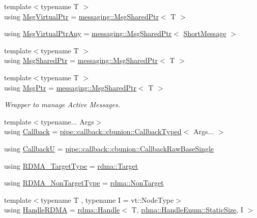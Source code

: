 \begin{DoxyCompactItemize}
\item 
{\footnotesize template$<$typename T $>$ }\\using \hyperlink{namespacevt_a82b5c92ea7ca3ddd2e8a2e27df87fa1a}{Msg\+Virtual\+Ptr} = \hyperlink{structvt_1_1messaging_1_1_msg_shared_ptr}{messaging\+::\+Msg\+Shared\+Ptr}$<$ T $>$
\item 
using \hyperlink{namespacevt_a54674b9f819f4f3a652c6f78d9b62aaf}{Msg\+Virtual\+Ptr\+Any} = \hyperlink{structvt_1_1messaging_1_1_msg_shared_ptr}{messaging\+::\+Msg\+Shared\+Ptr}$<$ \hyperlink{namespacevt_a1125ac1da6c0bbf141e0ea0739d7602d}{Short\+Message} $>$
\item 
{\footnotesize template$<$typename T $>$ }\\using \hyperlink{namespacevt_ab2b3d506ec8e8d1540aede826d84a239}{Msg\+Shared\+Ptr} = \hyperlink{structvt_1_1messaging_1_1_msg_shared_ptr}{messaging\+::\+Msg\+Shared\+Ptr}$<$ T $>$
\item 
{\footnotesize template$<$typename T $>$ }\\using \hyperlink{namespacevt_a9f5ebd62ee9d6dd8829e3e1cc4f858e9}{Msg\+Ptr} = \hyperlink{structvt_1_1messaging_1_1_msg_shared_ptr}{messaging\+::\+Msg\+Shared\+Ptr}$<$ T $>$
\begin{DoxyCompactList}\small\item\em Wrapper to manage Active Messages. \end{DoxyCompactList}\item 
{\footnotesize template$<$typename... Args$>$ }\\using \hyperlink{namespacevt_a57b238783d05de96bc2c4027f7073b7f}{Callback} = \hyperlink{structvt_1_1pipe_1_1callback_1_1cbunion_1_1_callback_typed}{pipe\+::callback\+::cbunion\+::\+Callback\+Typed}$<$ Args... $>$
\item 
using \hyperlink{namespacevt_af79a43a97bc3593fc349f086c874c48e}{CallbackU} = \hyperlink{structvt_1_1pipe_1_1callback_1_1cbunion_1_1_callback_raw_base_single}{pipe\+::callback\+::cbunion\+::\+Callback\+Raw\+Base\+Single}
\item 
using \hyperlink{namespacevt_a9bf03a57102d0274cc229b9ef94bb59e}{R\+D\+M\+A\+\_\+\+Target\+Type} = \hyperlink{structvt_1_1rdma_1_1_target}{rdma\+::\+Target}
\item 
using \hyperlink{namespacevt_ae5bd2866e5ee83f4d6a53e8730cd3202}{R\+D\+M\+A\+\_\+\+Non\+Target\+Type} = \hyperlink{structvt_1_1rdma_1_1_non_target}{rdma\+::\+Non\+Target}
\item 
{\footnotesize template$<$typename T , typename I  = vt\+::\+Node\+Type$>$ }\\using \hyperlink{namespacevt_abc3449a4b87363b942453d0b8cc18a7d}{Handle\+R\+D\+MA} = \hyperlink{structvt_1_1rdma_1_1_handle}{rdma\+::\+Handle}$<$ T, \hyperlink{namespacevt_1_1rdma_a0234ff19cfb3c04718cfdfd36b2d6d88a0c5c41d6a0319a61d3a5e8a060b7c4d7}{rdma\+::\+Handle\+Enum\+::\+Static\+Size}, I $>$

\end{DoxyCompactItemize}
